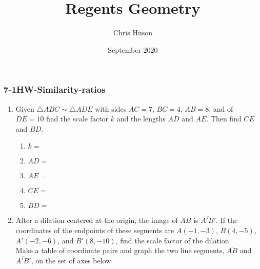 \documentclass[12pt, twoside]{article}
\title{Regents Geometry}
\author{Chris Huson}
\date{September 2020}
\begin{document}
\subsubsection*{7-1HW-Similarity-ratios}
\begin{enumerate}
\item Given $\triangle ABC \sim \triangle ADE$ with sides $AC = 7$, $BC = 4$, $AB = 8$, and of $DE = 10$ find the scale factor $k$ and the lengths $AD$ and $AE$. Then find $CE$ and $BD$. %
    \begin{multicols}{2}
      \begin{enumerate}
        \item $k=$ \vspace{0.3cm}
        \item $AD=$ \vspace{0.3cm}
        \item $AE=$ \vspace{0.3cm}
        \item $CE=$
        \item $BD=$
      \end{enumerate}
      \begin{flushright}
      \end{flushright} 
    \end{multicols}%

\item After a dilation centered at the origin, the image of $\overline{AB}$ is $\overline{A'B'}$. If the coordinates of the endpoints of these segments are $A(-1,-3)$, $B(4,-5)$, $A'(-2,-6)$, and $B'(8,-10)$, find the scale factor of the dilation.\\[0.25cm]
  Make a table of coordinate pairs and graph the two line segments,  $\overline{AB}$ and  $\overline{A'B'}$, on the set of axes below.
    \begin{flushright}
    \end{flushright}




\end{enumerate}
\end{document}
